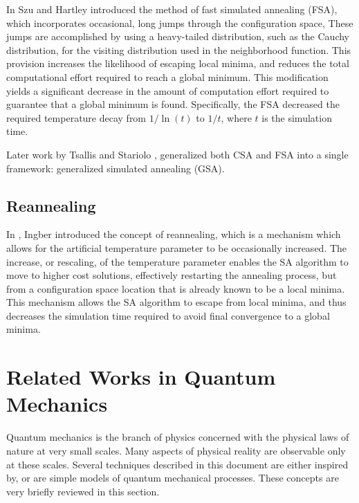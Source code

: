 \documentclass[11pt]{afthesis}
\begin{document}
	In \cite{szu1987fastsimulatedannealing} Szu and Hartley introduced the method of fast simulated annealing (FSA), which incorporates occasional, long jumps through the configuration space, These jumps are accomplished by using a heavy-tailed distribution, such as the Cauchy distribution, for the visiting distribution used in the neighborhood function. This provision increases the likelihood of escaping local minima, and reduces the total computational effort required to reach a global minimum. This modification yields a significant decrease in the amount of computation effort required to guarantee that a global minimum is found. Specifically, the FSA decreased the required temperature decay from $1/\ln(t)$ to $1/t$, where $t$ is the simulation time. 
	
	Later work by Tsallis and Stariolo \cite{tsallis1996generalizedsimulatedannealing}, generalized both CSA and FSA into a single framework: generalized simulated annealing (GSA). 
	 
	
	\subsection{Reannealing}
	
	In \cite{ingber1989veryfastsimulatedreannealing}, Ingber introduced the concept of reannealing, which is a mechanism which allows for the artificial temperature parameter to be occasionally increased. The increase, or rescaling, of the temperature parameter enables the SA algorithm to move to higher cost solutions, effectively restarting the annealing process, but from a configuration space location that is already known to be a local minima. This mechanism allows the SA algorithm to escape from local minima, and thus decreases the simulation time required to avoid final convergence to a global minima.
	
	\section{Related Works in Quantum Mechanics}
	
	Quantum mechanics is the branch of physics concerned with the physical laws of nature at very small scales. Many aspects of physical reality are observable only at these scales. Several techniques described in this document are either inspired by, or are simple models of quantum mechanical processes. These concepts are very briefly reviewed in this section. 
	
\end{document}
